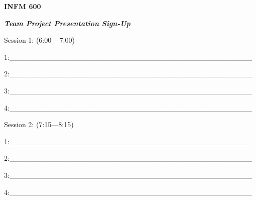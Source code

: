\documentclass[]{article}
\date{}
\begin{document}
\textbf{INFM 600}

\emph{\textbf{Team Project Presentation Sign-Up}}

Session 1: (6:00 -- 7:00)

1:\_\_\_\_\_\_\_\_\_\_\_\_\_\_\_\_\_\_\_\_\_\_\_\_\_\_\_\_\_\_\_\_\_\_\_\_\_\_\_\_\_\_\_\_\_\_

2:\_\_\_\_\_\_\_\_\_\_\_\_\_\_\_\_\_\_\_\_\_\_\_\_\_\_\_\_\_\_\_\_\_\_\_\_\_\_\_\_\_\_\_\_\_\_

3:\_\_\_\_\_\_\_\_\_\_\_\_\_\_\_\_\_\_\_\_\_\_\_\_\_\_\_\_\_\_\_\_\_\_\_\_\_\_\_\_\_\_\_\_\_\_

4:\_\_\_\_\_\_\_\_\_\_\_\_\_\_\_\_\_\_\_\_\_\_\_\_\_\_\_\_\_\_\_\_\_\_\_\_\_\_\_\_\_\_\_\_\_\_

Session 2: (7:15---8:15)

1:\_\_\_\_\_\_\_\_\_\_\_\_\_\_\_\_\_\_\_\_\_\_\_\_\_\_\_\_\_\_\_\_\_\_\_\_\_\_\_\_\_\_\_\_\_\_

2:\_\_\_\_\_\_\_\_\_\_\_\_\_\_\_\_\_\_\_\_\_\_\_\_\_\_\_\_\_\_\_\_\_\_\_\_\_\_\_\_\_\_\_\_\_\_

3:\_\_\_\_\_\_\_\_\_\_\_\_\_\_\_\_\_\_\_\_\_\_\_\_\_\_\_\_\_\_\_\_\_\_\_\_\_\_\_\_\_\_\_\_\_\_

4:\_\_\_\_\_\_\_\_\_\_\_\_\_\_\_\_\_\_\_\_\_\_\_\_\_\_\_\_\_\_\_\_\_\_\_\_\_\_\_\_\_\_\_\_\_\_
\end{document}
